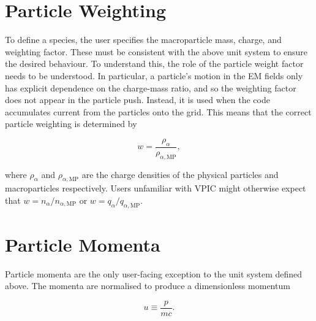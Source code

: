 \documentclass[twocolumn,10pt]{article}
\begin{document}
	\section{Particle Weighting}

	To define a species, the user specifies the macroparticle mass, charge, and weighting factor. These must be consistent with the above unit system to ensure the desired behaviour. To understand this, the role of the particle weight factor needs to be understood. In particular, a particle's motion in the EM fields only has explicit dependence on the charge-mass ratio, and so the weighting factor does not appear in the particle push. Instead, it is used when the code accumulates current from the particles onto the grid. This means that the correct particle weighting is determined by

	\begin{equation}
		w = \frac{\rho_{\alpha}}{\rho_{\alpha,\mathrm{MP}}},
	\end{equation}

	\noindent where $\rho_{\alpha}$ and $\rho_{\alpha,\mathrm{MP}}$ are the charge densities of the physical particles and macroparticles respectively. Users unfamiliar with VPIC might otherwise expect that $w=n_{\alpha}/n_{\alpha,\mathrm{MP}}$ or $w=q_{\alpha}/q_{\alpha,\mathrm{MP}}$.

	\section{Particle Momenta}

	Particle momenta are the only user-facing exception to the unit system defined above. The momenta are normalised to produce a dimensionless momentum
	
	\begin{equation}
		u \equiv \frac{p}{mc}.
	\end{equation}
\end{document}
